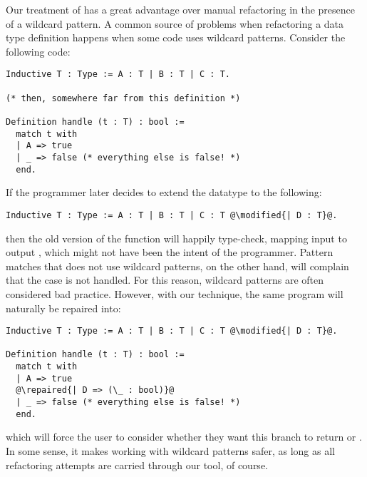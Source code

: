 Our treatment of  has a great advantage over manual refactoring
in the presence of a wildcard pattern.  A common source of problems when
refactoring a data type definition happens when some code uses wildcard
patterns.  Consider the following code:

\begin{verbatim}
Inductive T : Type := A : T | B : T | C : T.

(* then, somewhere far from this definition *)

Definition handle (t : T) : bool :=
  match t with
  | A => true
  | _ => false (* everything else is false! *)
  end.
\end{verbatim}

\noindent%
%
If the programmer later decides to extend the datatype to the following:

\begin{verbatim}
Inductive T : Type := A : T | B : T | C : T @\modified{| D : T}@.
\end{verbatim}

\noindent%
%
then the old version of the  function will happily type-check,
mapping input  to output , which might not have
been the intent of the programmer.  Pattern matches that does not use wildcard
patterns, on the other hand, will complain that the  case is not
handled.  For this reason, wildcard patterns are often considered bad practice.
However, with our technique, the same program will naturally be repaired into:

\begin{verbatim}
Inductive T : Type := A : T | B : T | C : T @\modified{| D : T}@.

Definition handle (t : T) : bool :=
  match t with
  | A => true
  @\repaired{| D => (\_ : bool)}@
  | _ => false (* everything else is false! *)
  end.
\end{verbatim}

\noindent%
%
which will force the user to consider whether they want this branch to return
 or .  In some sense, it makes working with
wildcard patterns safer, as long as all refactoring attempts are carried through
our tool, of course.


\paragraph{}

